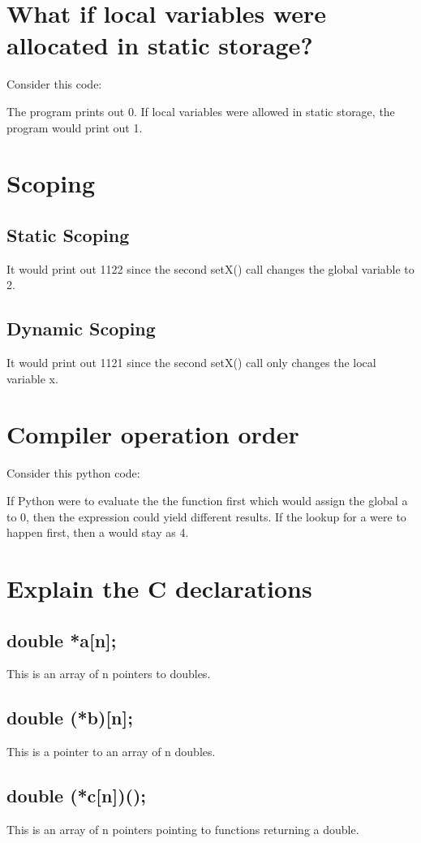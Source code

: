 \documentclass[11pt, oneside]{article}   	%
\begin{document}
\section{What if local variables were allocated in static storage?}
Consider this code:

The program prints out 0. If local variables were allowed in static storage, the program would print out 1.

\section{Scoping}
\subsection{Static Scoping}
It would print out 1122 since the second setX() call changes the global variable to 2.
\subsection{Dynamic Scoping}
It would print out 1121 since the second setX() call only changes the local variable x.

\section{Compiler operation order}
Consider this python code:

If Python were to evaluate the the function first which would assign the global a to 0, then the expression could yield different results. If the lookup for a were to happen first, then a would stay as 4.

\section{Explain the C declarations}

\subsection{double *a[n];}
This is an array of n pointers to doubles.
\subsection{double (*b)[n];}
This is a pointer to an array of n doubles.
\subsection{double (*c[n])();}
This is an array of n pointers pointing to functions returning a double.
\end{document}
